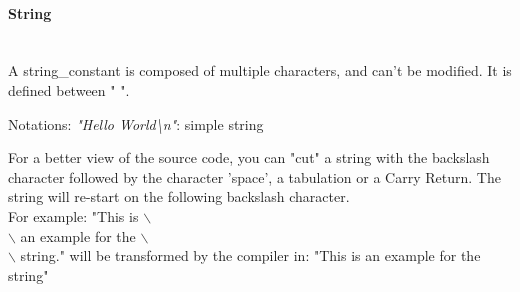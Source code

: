 \documentclass[11pt]{mybook}
\begin{document}
\paragraph{String} 
~\\
A {\sc{}string\_constant} is composed of multiple characters, and can't be modified. It is defined between " ".
\begin{tabbing}
Notations: \={\it{}"Hello World\textbackslash n"}: simple string
\end{tabbing}

For a better view of the source code, you can "cut" a string with the
backslash character followed by the character 'space', a tabulation or a 
Carry Return.
The string will re-start on the following backslash character.\\

For example: "This is $\backslash$ \\$\backslash$ an example for the $\backslash$\\ $\backslash$ string."
 will be transformed by the compiler in: "This is an example for the string"\\ 

\end{document}
